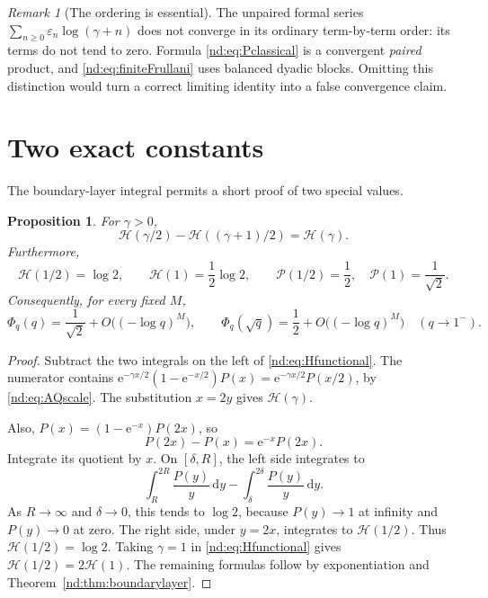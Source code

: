 \documentclass[11pt,a4paper,oneside,openany]{book}
\numberwithin{equation}{chapter}
\newtheorem{proposition}[theorem]{Proposition}
\theoremstyle{definition}
\theoremstyle{remark}
\newtheorem{remark}[theorem]{Remark}
\newcommand{\eps}{\varepsilon}
\newcommand{\dd}{\,\mathrm d}
\newcommand{\e}{\mathrm e}
\begin{document}
\begin{remark}[The ordering is essential]
The unpaired formal series
\(\sum_{n\ge0}\eps_n\log(\gamma+n)\) does not converge in its ordinary
term-by-term order: its terms do not tend to zero. Formula
\eqref{nd:eq:Pclassical} is a convergent \emph{paired} product, and
\eqref{nd:eq:finiteFrullani} uses balanced dyadic blocks. Omitting this distinction
would turn a correct limiting identity into a false convergence claim.
\end{remark}

\section{Two exact constants}
The boundary-layer integral permits a short proof of two special values.

\begin{proposition}
\label{nd:prop:constants}
For \(\gamma>0\),
\begin{equation}
 \mathcal H(\gamma/2)-\mathcal H((\gamma+1)/2)=\mathcal H(\gamma).
 \label{nd:eq:Hfunctional}
\end{equation}
Furthermore,
\begin{equation}
 \mathcal H(1/2)=\log2,\qquad \mathcal H(1)=\frac12\log2,
 \qquad \mathcal P(1/2)=\frac12,\quad\mathcal P(1)=\frac1{\sqrt2}.
 \label{nd:eq:Hconstants}
\end{equation}
Consequently, for every fixed \(M\),
\begin{equation}
 \Phi_q(q)=\frac1{\sqrt2}+O\bigl((-\log q)^M\bigr),\qquad
 \Phi_q(\sqrt q)=\frac12+O\bigl((-\log q)^M\bigr)
 \quad(q\to1^-).
 \label{nd:eq:diagonalconstants}
\end{equation}
\end{proposition}
\begin{proof}
Subtract the two integrals on the left of \eqref{nd:eq:Hfunctional}.
The numerator contains
\(\e^{-\gamma x/2}(1-\e^{-x/2})P(x)
 =\e^{-\gamma x/2}P(x/2)\), by \eqref{nd:eq:AQscale}.
The substitution \(x=2y\) gives \(\mathcal H(\gamma)\).

Also, \(P(x)=(1-\e^{-x})P(2x)\), so
\[
 P(2x)-P(x)=\e^{-x}P(2x).
\]
Integrate its quotient by \(x\). On \([\delta,R]\), the left side integrates
to
\[
 \int_R^{2R}\frac{P(y)}y\dd y-
 \int_\delta^{2\delta}\frac{P(y)}y\dd y.
\]
As \(R\to\infty\) and \(\delta\to0\), this tends to \(\log2\), because
\(P(y)\to1\) at infinity and \(P(y)\to0\) at zero. The right side, under
\(y=2x\), integrates to \(\mathcal H(1/2)\). Thus
\(\mathcal H(1/2)=\log2\). Taking \(\gamma=1\) in
\eqref{nd:eq:Hfunctional} gives \(\mathcal H(1/2)=2\mathcal H(1)\).
The remaining formulas follow by exponentiation and
Theorem~\ref{nd:thm:boundarylayer}.
\end{proof}
\end{document}
